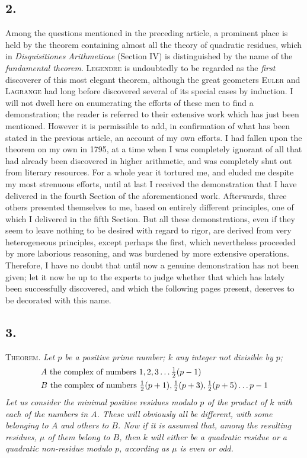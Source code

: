 \documentclass[twoside,12pt]{memoir}
\let\oldfrac\frac
\def\frac#1#2{\mathchoice{\tfrac{#1}{#2}}{\oldfrac{#1}{#2}}{\genfrac{}{}{}{2}{#1}{#2\mathstrut}}{\genfrac{}{}{}{3}{#1}{#2\mathstrut}}}
\begin{document}
\subsection*{2.}

Among the questions mentioned in the preceding article, a prominent place is held by the theorem containing almost all the theory of quadratic residues, which in  \textit{Disquisitiones Arithmeticae} (Section IV) is distinguished by the name of the \textit{fundamental theorem}.  \textsc{Legendre} is undoubtedly to be regarded as the \textit{first} discoverer of this most elegant theorem, although the great geometers \textsc{Euler} and \textsc{Lagrange} had long before discovered several of its special cases by induction.   I will not dwell here on enumerating the efforts of these men to find a demonstration; the reader is referred to their extensive work which has just been mentioned.  However it is permissible to add, in confirmation of what has been stated in the previous article, an account of my own efforts.   I had fallen upon the theorem on my own in 1795, at a time when I was completely ignorant of all that had already been discovered in higher arithmetic, and was completely shut out from literary resources.  For a whole year it tortured me, and eluded me despite my most strenuous efforts, until at last I received the demonstration that I have delivered in the fourth Section of the aforementioned work.  Afterwards, three others presented themselves to me, based on entirely different principles, one of which I delivered in the fifth Section.  But all these demonstrations, even if they seem to leave nothing to be desired with regard to rigor, are derived from very heterogeneous principles, except perhaps the first, which nevertheless proceeded by more laborious reasoning, and was burdened by more extensive operations.  Therefore, I have no doubt that until now a genuine demonstration has not been given;  let it now be up to the experts to judge whether that which has lately been successfully discovered, and which the following pages present, deserves to be decorated with this name.

\subsection*{3.}

\textsc{Theorem.} \textit{Let \(p\) be a positive prime number; \(k\) any integer not divisible by \(p\);
\[\begin{aligned}
&A \text{ the complex of numbers }1,2,3 \ldots \frac{1}{2}(p-1)\\
&B \text{ the complex of numbers } \frac{1}{2}(p+1), \frac{1}{2}(p+3), \frac{1}{2}(p+5) \ldots p-1
\end{aligned}\]
Let us consider the minimal positive residues modulo \(p\) of the product of \(k\) with each of the numbers in \(A\).  These will obviously all be different, with some belonging to \(A\) and others to \(B\). Now if it is assumed that, among the resulting residues, \(\mu\) of them belong to \(B\), then \(k\) will either be a quadratic residue or a quadratic non-residue modulo \(p\), according as \(\mu\) is even or odd.}
\end{document}
